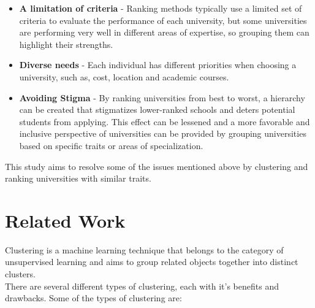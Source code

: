 \documentclass[conference]{IEEEtran}
\begin{document}
\begin{itemize}
    \item \textbf{A limitation of criteria} - Ranking methods typically use a limited set of criteria to evaluate the performance of each university, but some universities are performing very well in different areas of expertise, so grouping them can highlight their strengths. 
    \item \textbf{Diverse needs} - Each individual has different priorities when choosing a university, such as, cost, location and academic courses. 
    \item \textbf{Avoiding Stigma} - By ranking universities from best to worst, a hierarchy can be created that stigmatizes lower-ranked schools and deters potential students from applying. This effect can be lessened and a more favorable and inclusive perspective of universities can be provided by grouping universities based on specific traits or areas of specialization. \\
\end{itemize}

This study aims to resolve some of the issues mentioned above by clustering and ranking universities with similar traits.

\section{Related Work}
Clustering is a machine learning technique that belongs to the category of unsupervised learning and aims to group related objects together into distinct clusters. \\
There are several different types of clustering, each with it's benefits and drawbacks. Some of the types of clustering are: \\
\end{document}
